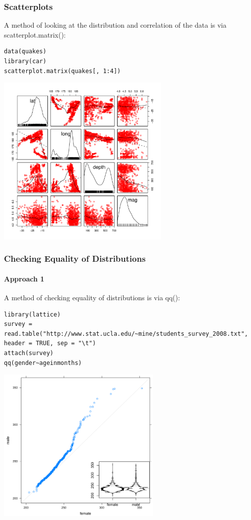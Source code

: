 \begin{frame}
\frametitle{Scatterplots}

A method of looking at the distribution and correlation of the data is via \ttfamily scatterplot.matrix(): \normalfont
  		\begin{lstlisting}
data(quakes)
library(car)		
scatterplot.matrix(quakes[, 1:4])
		\end{lstlisting}

        \begin{center}
         \includegraphics[width=0.63\textwidth]{images/scatterPlot.pdf}
        \end{center}
\end{frame}

\begin{frame}
\frametitle{Checking Equality of Distributions}
\framesubtitle{Approach 1}

A method of checking equality of distributions is via \ttfamily qq(): \normalfont
  		\begin{lstlisting}
library(lattice)
survey = read.table("http://www.stat.ucla.edu/~mine/students_survey_2008.txt", header = TRUE, sep = "\t")
attach(survey) 
qq(gender~ageinmonths)
		\end{lstlisting}

        \begin{center}
         \includegraphics[width=0.6\textwidth]{images/qq.png}
        \end{center}
\end{frame}

